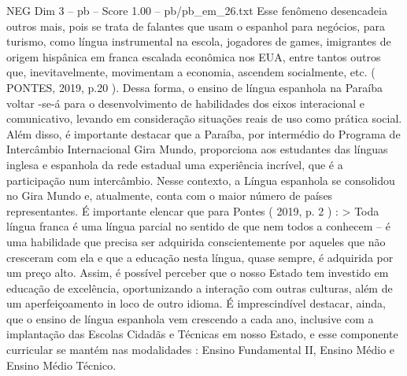 \begin{textsample}{NEG Dim 3 – pb – Score 1.00 – pb/pb\_em\_26.txt}
Esse fenômeno desencadeia outros mais, pois se trata de falantes que usam o espanhol para negócios, para turismo, como língua instrumental na escola, jogadores de games, imigrantes de origem hispânica em franca escalada econômica nos EUA, entre tantos outros que, inevitavelmente, movimentam a economia, ascendem socialmente, etc. ( PONTES, 2019, p.20 ).
Dessa forma, o ensino de língua espanhola na Paraíba voltar -se-á para o desenvolvimento de habilidades dos eixos interacional e comunicativo, levando em consideração situações reais de uso como prática social.
Além disso, é importante destacar que a Paraíba, por intermédio do Programa de Intercâmbio Internacional Gira Mundo, proporciona aos estudantes das línguas inglesa e espanhola da rede estadual uma experiência incrível, que é a participação num intercâmbio.
Nesse contexto, a Língua espanhola se consolidou no Gira Mundo e, atualmente, conta com o maior número de países representantes.
É importante elencar que para Pontes ( 2019, p. 2 ) : > Toda língua franca é uma língua parcial no sentido de que nem todos a conhecem – é uma habilidade que precisa ser adquirida conscientemente por aqueles que não cresceram com ela e que a educação nesta língua, quase sempre, é adquirida por um preço alto.
Assim, é possível perceber que o nosso Estado tem investido em educação de excelência, oportunizando a interação com outras culturas, além de um aperfeiçoamento in loco de outro idioma.
É imprescindível destacar, ainda, que o ensino de língua espanhola vem crescendo a cada ano, inclusive com a implantação das Escolas Cidadãs e Técnicas em nosso Estado, e esse componente curricular se mantém nas modalidades : Ensino Fundamental II, Ensino Médio e Ensino Médio Técnico.

\end{textsample}
